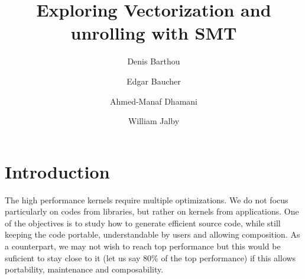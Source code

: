 \documentclass[sigconf,review]{acmart}
\begin{document}



\title{Exploring Vectorization and unrolling with SMT}

\author{Denis Barthou}
\author{Edgar Baucher}
\author{Ahmed-Manaf Dhamani}
\author{William Jalby}



\begin{abstract}
  
\end{abstract}
\keywords{}

\maketitle



\section{Introduction}
The high performance kernels require multiple optimizations. We do not
focus particularly on codes from libraries, but rather on kernels from
applications. One of the objectives is to study how to generate
efficient source code, while still keeping the code portable,
understandable by users and allowing composition. As a counterpart, we
may not wish to reach top performance but this would be suficient to
stay close to it (let us say 80\% of the top performance) if this
allows portability, maintenance and composability.
\end{document}
